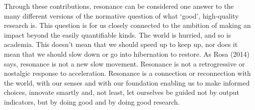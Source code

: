 \par
Through these contributions, resonance can be considered one answer to the many different versions of the normative question of what ‘good’, high-quality research is. This question is for us closely connected to the ambition of making an impact beyond the easily quantifiable kinds. The world is hurried, and so is academia. This doesn’t mean that we should speed up to keep up, nor does it mean that we should slow down or go into hibernation to restore. As Rosa (2014) says, resonance is not a new slow movement. Resonance is not a retrogressive or nostalgic response to acceleration. Resonance is a connection or reconnection with the world, with our senses and with our foundation enabling us to make informed choices, innovate smartly and, not least, let ourselves be guided not by output indicators, but by doing good and by doing good research.